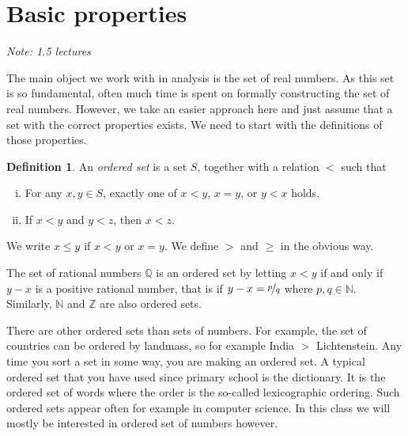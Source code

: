 \documentclass[12pt]{book}
\newcommand{\Z}{{\mathbb{Z}}}
\newcommand{\N}{{\mathbb{N}}}
\newcommand{\Q}{{\mathbb{Q}}}
\newcommand{\myindex}[1]{#1\index{#1}}
\newcommand{\sectionnotes}[1]{\noindent \emph{Note: #1} \medskip \par}
\theoremstyle{plain}
\theoremstyle{remark}
\theoremstyle{definition}
\newtheorem{defn}[thm]{Definition}
\theoremstyle{exercise}
\theoremstyle{example}
\begin{document}

\section{Basic properties} \label{sec:basicpropsrn}

\sectionnotes{1.5 lectures}

The main object we work with in analysis is the set of
\myindex{real numbers}.  As this set is so fundamental, often much time is
spent on formally constructing the set of real numbers.  However, we 
take an easier approach here and just assume that a set with the correct
properties exists.  We need to start with the definitions of those
properties.

\begin{defn}
An \emph{\myindex{ordered set}} is a set $S$, together with
a relation $<$ such that
\begin{enumerate}[(i)]
\item For any $x, y \in S$, exactly one of
$x < y$, $x=y$, or $y < x$ holds.
\item If $x < y$ and $y < z$, then $x < z$.
\end{enumerate}
We write $x \leq y$ if $x < y$ or $x=y$.  We define
$>$ and $\geq$ in the obvious way.
\end{defn}


The set of rational numbers $\Q$ is an ordered set by letting
$x < y$ if and only if $y-x$ is a positive rational number, that is
if $y-x = \nicefrac{p}{q}$ where $p,q \in \N$.  Similarly,
$\N$ and $\Z$ are also ordered sets.

There are other ordered sets than sets of numbers.  For example, the
set of countries can be ordered by landmass, so for example India $>$
Lichtenstein.  Any time you sort a set in some way, you are making an ordered
set.  A typical ordered set that you have used since primary school is the
dictionary.  It is the ordered set of words where the order is the
so-called lexicographic ordering.  Such ordered sets appear often for example in
computer science.  In this class we will mostly be interested in ordered
set of numbers however.
\end{document}
